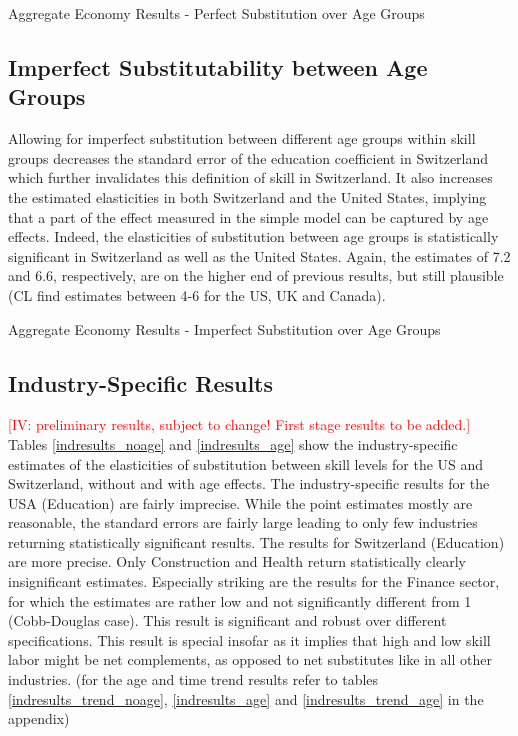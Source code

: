 \documentclass[]{article}
\begin{document}
\begin{table}[H]
  \centering
  \caption{Aggregate Economy Results - Perfect Substitution over Age
    Groups}
  
  \label{noage_main}
\end{table}%

\subsection{Imperfect Substitutability between Age Groups}
Allowing for imperfect substitution between different age groups
within skill groups decreases the standard error of the education
coefficient in Switzerland which further invalidates this definition
of skill in Switzerland. It also increases the estimated elasticities
in both Switzerland and the United States, implying that a part of the
effect measured in the simple model can be captured by age
effects. Indeed, the elasticities of substitution between age groups
is statistically significant in Switzerland as well as the United
States. Again, the estimates of 7.2 and 6.6, respectively, are on the
higher end of previous results, but still plausible (CL find estimates
between 4-6 for the US, UK and Canada).

\begin{table}[H]
  \centering
  \caption{Aggregate Economy Results - Imperfect Substitution over Age
    Groups}
  
  \label{age_main}
\end{table}%

\subsection{Industry-Specific Results}
\textcolor{red}{[IV: preliminary results, subject to change! First
  stage results to be added.]}  Tables \ref{indresults_noage} and
\ref{indresults_age} show the industry-specific estimates of the
elasticities of substitution between skill levels for the US and
Switzerland, without and with age effects. The industry-specific
results for the USA (Education) are fairly imprecise. While the point
estimates mostly are reasonable, the standard errors are fairly large
leading to only few industries returning statistically significant
results. The results for Switzerland (Education) are more
precise. Only Construction and Health return statistically clearly
insignificant estimates. Especially striking are the results for the
Finance sector, for which the estimates are rather low and not
significantly different from 1 (Cobb-Douglas case). This result is
significant and robust over different specifications. This result is
special insofar as it implies that high and low skill labor might be
net complements, as opposed to net substitutes like in all other
industries. (for the age and time trend results refer to tables
\ref{indresults_trend_noage}, \ref{indresults_age} and
\ref{indresults_trend_age} in the appendix)
\end{document}
